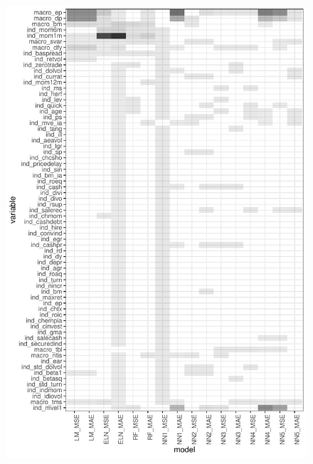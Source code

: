 \documentclass[a4paper, table]{article}
\begin{document}
\begin{figure}
	\includegraphics{empirical_sample_3_vi.pdf}
\end{figure}
\end{document}
